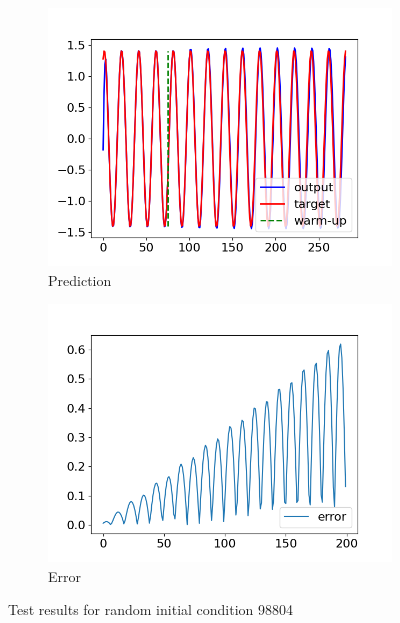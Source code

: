 \begin{figure}[h]
	\centering
	\begin{subfigure}[b]{0.45\textwidth}
		\includegraphics[width=\textwidth]{../Results/Test-Task02/Figures/RNN-lstm-RDIM_1-N_used_50000-NUM-LAY_1-SIZE-LAY_100-ACT_tanh-ISH_statefull-SL_8-PL_4-LR_0.001-DKP_1.0-ZKP_1.0-HSPL_300-IPL_200-NL_1-WID_0/prediction_augmend_TEST_98804.png}
		\caption{Prediction}
	\end{subfigure}
	\begin{subfigure}[b]{0.45\textwidth}
		\includegraphics[width=\textwidth]{../Results/Test-Task02/Figures/RNN-lstm-RDIM_1-N_used_50000-NUM-LAY_1-SIZE-LAY_100-ACT_tanh-ISH_statefull-SL_8-PL_4-LR_0.001-DKP_1.0-ZKP_1.0-HSPL_300-IPL_200-NL_1-WID_0/prediction_TEST_98804_error.png}
		\caption{Error}
	\end{subfigure}
	\caption{Test results for random initial condition 98804}
	\label{2:predictions2}
\end{figure}